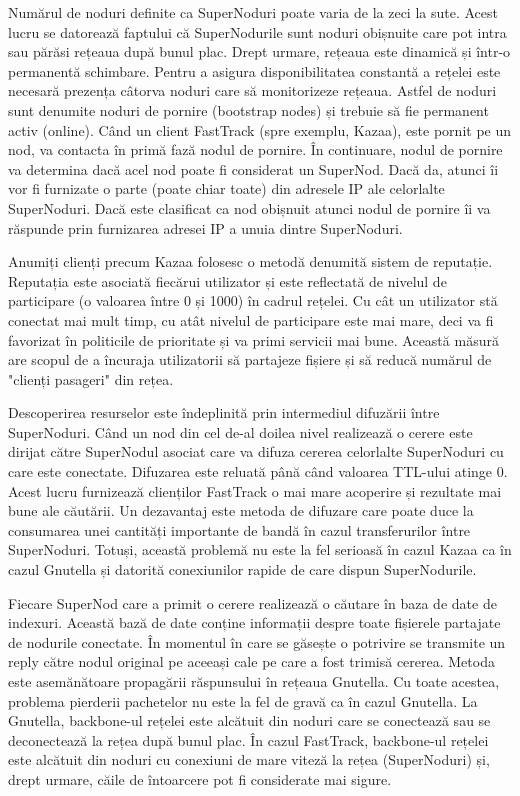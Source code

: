 Numărul de noduri definite ca SuperNoduri poate varia de la zeci la sute.
Acest lucru se datorează faptului că SuperNodurile sunt noduri obișnuite care
pot intra sau părăsi rețeaua după bunul plac. Drept urmare, rețeaua este
dinamică și într-o permanentă schimbare. Pentru a asigura disponibilitatea
constantă a rețelei este necesară prezența câtorva noduri care să monitorizeze
rețeaua. Astfel de noduri sunt denumite noduri de pornire (bootstrap nodes) și
trebuie să fie permanent activ (online). Când un client FastTrack (spre
exemplu, Kazaa), este pornit pe un nod, va contacta în primă fază nodul de
pornire. În continuare, nodul de pornire va determina dacă acel nod poate fi
considerat un SuperNod. Dacă da, atunci îi vor fi furnizate o parte (poate
chiar toate) din adresele IP ale celorlalte SuperNoduri. Dacă este clasificat
ca nod obișnuit atunci nodul de pornire îi va răspunde prin furnizarea adresei
IP a unuia dintre SuperNoduri.

Anumiți clienți precum Kazaa folosesc o metodă denumită sistem de reputație.
Reputația este asociată fiecărui utilizator și este reflectată de nivelul de
participare (o valoarea între 0 și 1000) în cadrul rețelei. Cu cât un
utilizator stă conectat mai mult timp, cu atât nivelul de participare este mai
mare, deci va fi favorizat în politicile de prioritate și va primi servicii
mai bune. Această măsură are scopul de a încuraja utilizatorii să partajeze
fișiere și să reducă numărul de "clienți pasageri" din rețea.

Descoperirea resurselor este îndeplinită prin intermediul difuzării între
SuperNoduri. Când un nod din cel de-al doilea nivel realizează o cerere este
dirijat către SuperNodul asociat care va difuza cererea celorlalte SuperNoduri
cu care este conectate. Difuzarea este reluată până când valoarea TTL-ului
atinge 0. Acest lucru furnizează clienților FastTrack o mai mare acoperire și
rezultate mai bune ale căutării. Un dezavantaj este metoda de difuzare care
poate duce la consumarea unei cantități importante de bandă în cazul
transferurilor între SuperNoduri. Totuși, această problemă nu este la fel
serioasă în cazul Kazaa ca în cazul Gnutella și datorită conexiunilor rapide
de care dispun SuperNodurile.

Fiecare SuperNod care a primit o cerere realizează o căutare în baza de date
de indexuri. Această bază de date conține informații despre toate fișierele
partajate de nodurile conectate. În momentul în care se găsește o potrivire se
transmite un reply către nodul original pe aceeași cale pe care a fost trimisă
cererea. Metoda este asemănătoare propagării răspunsului în rețeaua Gnutella.
Cu toate acestea, problema pierderii pachetelor nu este la fel de gravă ca în
cazul Gnutella. La Gnutella, backbone-ul rețelei este alcătuit din noduri care
se conectează sau se deconectează la rețea după bunul plac. În cazul
FastTrack, backbone-ul rețelei este alcătuit din noduri cu conexiuni de mare
viteză la rețea (SuperNoduri) și, drept urmare, căile de întoarcere pot fi
considerate mai sigure.

